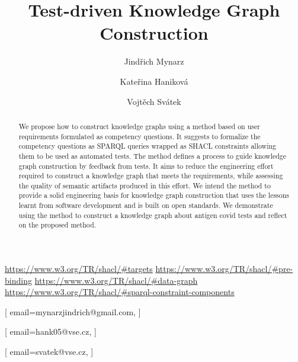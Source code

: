 \documentclass[
]{ceurart}
\begin{document}
\urldef\urlshacltargets\url{https://www.w3.org/TR/shacl/#targets}
\urldef\urlshaclprebinding\url{https://www.w3.org/TR/shacl/#pre-binding}
\urldef\urlschaclgraphdata\url{https://www.w3.org/TR/shacl/#data-graph}
\urldef\urlshaclconstraintcomponent\url{https://www.w3.org/TR/shacl/#sparql-constraint-components}


\title{Test-driven Knowledge Graph Construction}


\author[1]{Jindřich Mynarz}[%
email=mynarzjindrich@gmail.com,
]
\address[1]{Department of Information and Knowledge Engineering, Prague University of Economics and Business \\ Nám. W. Churchilla 4, 130 67, Praha 3, Czech Republic}

\author[1]{Kateřina Haniková}[%
email=hank05@vse.cz,
]

\author[1]{Vojtěch Svátek}[%
email=svatek@vse.cz,
]

\begin{abstract}
  We propose how to construct knowledge graphs using a method based on user requirements formulated as competency questions. It suggests to formalize the competency questions as SPARQL queries wrapped as SHACL constraints allowing them to be used as automated tests. The method defines a process to guide knowledge graph construction by feedback from tests. It aims to reduce the engineering effort required to construct a knowledge graph that meets the requirements, while assessing the quality of semantic artifacts produced in this effort. We intend the method to provide a solid engineering basis for knowledge graph construction that uses the lessons learnt from software development and is built on open standards. We demonstrate using the method to construct a knowledge graph about antigen covid tests and reflect on the proposed method.
\end{abstract}
\end{document}
